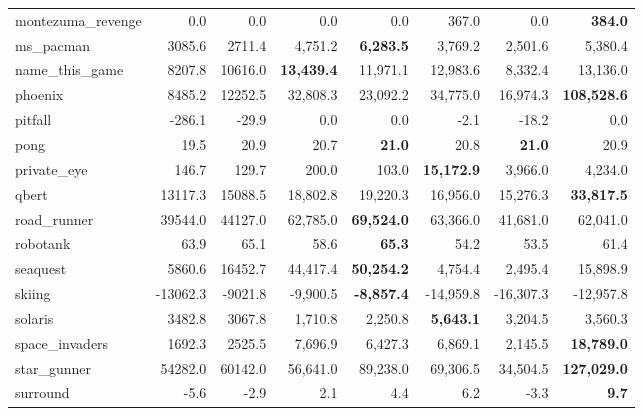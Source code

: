 \documentclass[letterpaper]{article} \usepackage{aaai18}  \usepackage{times}  \usepackage{helvet}  \usepackage{courier}  \usepackage{url}  \usepackage{graphicx}  \usepackage{amsmath,amssymb}
\begin{document}
\begin{table*}[t]
{\begin{tabular}{l|rrrrrrr}
 montezuma\_revenge &       0.0 &       0.0 &         0.0 &        0.0 &          367.0 &        0.0 &     {\bf  384.0 }\\
         ms\_pacman &    3085.6 &    2711.4 &     4,751.2 &   {\bf  6,283.5} &        3,769.2 &    2,501.6 &    5,380.4 \\
    name\_this\_game &    8207.8 &   10616.0 &   {\bf  13,439.4} &   11,971.1 &       12,983.6 &    8,332.4 &   13,136.0 \\
           phoenix &    8485.2 &   12252.5 &    32,808.3 &   23,092.2 &       34,775.0 &   16,974.3 &  {\bf 108,528.6 }\\
           pitfall &    -286.1 &     -29.9 &         0.0 &        0.0 &           -2.1 &      -18.2 &        0.0 \\
              pong &      19.5 &      20.9 &        20.7 &       {\bf 21.0 }&           20.8 &       {\bf 21.0} &       20.9 \\
       private\_eye &     146.7 &     129.7 &       200.0 &      103.0 &       {\bf 15,172.9 }&    3,966.0 &    4,234.0 \\
             qbert &   13117.3 &   15088.5 &    18,802.8 &   19,220.3 &       16,956.0 &   15,276.3 &   {\bf 33,817.5 }\\
       road\_runner &   39544.0 &   44127.0 &    62,785.0 &  {\bf  69,524.0 }&       63,366.0 &   41,681.0 &   62,041.0 \\
          robotank &      63.9 &      65.1 &        58.6 &      {\bf  65.3 }&           54.2 &       53.5 &       61.4 \\
          seaquest &    5860.6 &   16452.7 &    44,417.4 &  {\bf  50,254.2 }&        4,754.4 &    2,495.4 &   15,898.9 \\
            skiing &  -13062.3 &   -9021.8 &    -9,900.5 &  {\bf  -8,857.4} &      -14,959.8 &  -16,307.3 &  -12,957.8 \\
           solaris &    3482.8 &    3067.8 &     1,710.8 &    2,250.8 &      {\bf   5,643.1} &    3,204.5 &    3,560.3 \\
    space\_invaders &    1692.3 &    2525.5 &     7,696.9 &    6,427.3 &        6,869.1 &    2,145.5 &  {\bf  18,789.0 }\\
       star\_gunner &   54282.0 &   60142.0 &    56,641.0 &   89,238.0 &       69,306.5 &   34,504.5 & {\bf  127,029.0} \\
          surround &      -5.6 &      -2.9 &         2.1 &        4.4 &            6.2 &       -3.3 &      {\bf   9.7} \\

\end{tabular}}
\end{table*}
\end{document}
